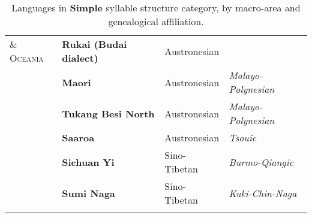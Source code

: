 \begin{table}
\begin{tabularx}{\textwidth}{XXXX}
\textsc{\&} \textsc{Oceania} & \textbf{Rukai (Budai dialect)} & Austronesian & \\
\hhline{-~~~} & \textbf{Maori} & Austronesian & \textit{Malayo-Polynesian}\\
& \textbf{Tukang Besi North} & Austronesian & \textit{Malayo-Polynesian}\\
& \textbf{Saaroa} & Austronesian & \textit{Tsouic}\\
& \textbf{Sichuan Yi} & Sino-Tibetan & \textit{Burmo-Qiangic}\\
& \textbf{Sumi Naga} & Sino-Tibetan & \textit{Kuki-Chin-Naga}\\
\hhline{~---}
\lspbottomrule
\end{tabularx}
\caption{\label{tab:2.4.} Languages in \textbf{Simple} syllable structure category, by macro-area and genealogical affiliation.}
\end{table}




